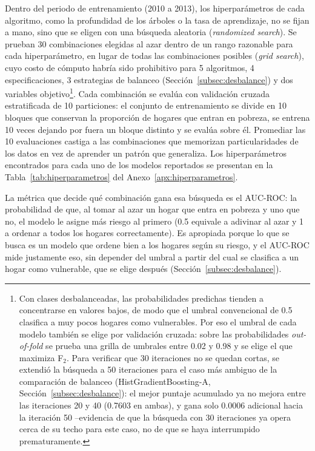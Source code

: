 \documentclass[12pt, letterpaper]{article}
\begin{document}
Dentro del periodo de entrenamiento (2010 a 2013), los hiperparámetros de
cada algoritmo, como la profundidad de los árboles o la tasa de
aprendizaje, no se fijan a mano, sino que se eligen con una búsqueda
aleatoria (\emph{randomized search}). Se prueban 30 combinaciones
elegidas al azar dentro de un rango razonable para cada hiperparámetro, en
lugar de todas las combinaciones posibles (\emph{grid search}), cuyo costo
de cómputo habría sido prohibitivo para 5 algoritmos, 4 especificaciones,
3 estrategias de balanceo (Sección~\ref{subsec:desbalance}) y dos
variables objetivo\footnote{Con clases desbalanceadas, las probabilidades predichas tienden a
concentrarse en valores bajos, de modo que el umbral convencional de 0.5
clasifica a muy pocos hogares como vulnerables. Por eso el umbral de cada
modelo también se elige por validación cruzada: sobre las probabilidades
\emph{out-of-fold} se prueba una grilla de umbrales entre 0.02 y 0.98 y se
elige el que maximiza F$_2$. Para verificar que 30 iteraciones no se
quedan cortas, se extendió la búsqueda a 50 iteraciones para el caso más
ambiguo de la comparación de balanceo (HistGradientBoosting-A,
Sección~\ref{subsec:desbalance}): el mejor puntaje acumulado ya no mejora entre las
iteraciones 20 y 40 (0.7603 en ambas), y gana solo 0.0006 adicional hacia
la iteración 50 --evidencia de que la búsqueda con 30 iteraciones ya
opera cerca de su techo para este caso, no de que se haya interrumpido
prematuramente.}. Cada combinación se evalúa con validación cruzada
estratificada de 10 particiones: el conjunto de entrenamiento se divide en
10 bloques que conservan la proporción de hogares que entran en pobreza,
se entrena 10 veces dejando por fuera un bloque distinto y se evalúa sobre
él. Promediar las 10 evaluaciones castiga a las combinaciones que
memorizan particularidades de los datos en vez de aprender un patrón que
generaliza. Los hiperparámetros encontrados para cada uno de los modelos
reportados se presentan en la Tabla~\ref{tab:hiperparametros} del
Anexo~\ref{apx:hiperparametros}.

La métrica que decide qué combinación
gana esa búsqueda es el AUC-ROC: la probabilidad de que, al tomar al azar
un hogar que entra en pobreza y uno que no, el modelo le asigne más
riesgo al primero (0.5 equivale a adivinar al azar y 1 a ordenar a todos
los hogares correctamente). Es apropiada porque lo que se busca es un
modelo que ordene bien a los hogares según su riesgo, y el AUC-ROC mide
justamente eso, sin depender del umbral a partir del cual se clasifica a
un hogar como vulnerable, que se elige después
(Sección~\ref{subsec:desbalance}). 
\end{document}
